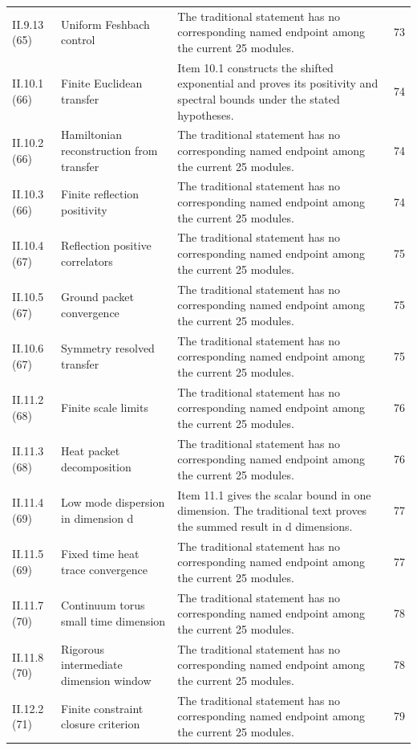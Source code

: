 {\begin{longtable}{@{}p{.13\linewidth}p{.31\linewidth}p{.42\linewidth}r@{}}
II.9.13 (65) & Uniform Feshbach control & The traditional statement has no corresponding named endpoint among the current 25 modules. & 73\\
II.10.1 (66) & Finite Euclidean transfer & Item 10.1 constructs the shifted exponential and proves its positivity and spectral bounds under the stated hypotheses. & 74\\
II.10.2 (66) & Hamiltonian reconstruction from transfer & The traditional statement has no corresponding named endpoint among the current 25 modules. & 74\\
II.10.3 (66) & Finite reflection positivity & The traditional statement has no corresponding named endpoint among the current 25 modules. & 74\\
II.10.4 (67) & Reflection positive correlators & The traditional statement has no corresponding named endpoint among the current 25 modules. & 75\\
II.10.5 (67) & Ground packet convergence & The traditional statement has no corresponding named endpoint among the current 25 modules. & 75\\
II.10.6 (67) & Symmetry resolved transfer & The traditional statement has no corresponding named endpoint among the current 25 modules. & 75\\
II.11.2 (68) & Finite scale limits & The traditional statement has no corresponding named endpoint among the current 25 modules. & 76\\
II.11.3 (68) & Heat packet decomposition & The traditional statement has no corresponding named endpoint among the current 25 modules. & 76\\
II.11.4 (69) & Low mode dispersion in dimension d & Item 11.1 gives the scalar bound in one dimension. The traditional text proves the summed result in d dimensions. & 77\\
II.11.5 (69) & Fixed time heat trace convergence & The traditional statement has no corresponding named endpoint among the current 25 modules. & 77\\
II.11.7 (70) & Continuum torus small time dimension & The traditional statement has no corresponding named endpoint among the current 25 modules. & 78\\
II.11.8 (70) & Rigorous intermediate dimension window & The traditional statement has no corresponding named endpoint among the current 25 modules. & 78\\
II.12.2 (71) & Finite constraint closure criterion & The traditional statement has no corresponding named endpoint among the current 25 modules. & 79\\

\end{longtable}}
